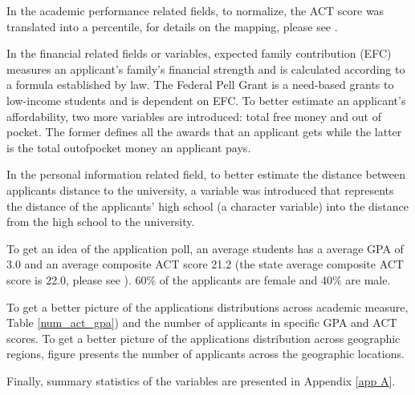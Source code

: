 \documentclass[12pt,english]{report}
\begin{document}
In the academic performance related fields, to normalize, the ACT score was
translated into a percentile, for details on the mapping, please see
\citet{ACT_percentile}.
 
In the financial related fields or variables, expected family contribution
(EFC) measures an applicant's family's financial strength and is calculated
according to a formula established by law. The Federal Pell Grant is a
need-based grants to low-income students and is dependent on EFC. To better
estimate an applicant's affordability, two more variables are introduced: total
free money and out of pocket. The former defines all the awards that an
applicant gets while the latter is the total out\-of\-pocket money an applicant
pays.

In the personal information related field, to better estimate the distance
between applicants distance to the university, a variable was introduced that
represents the distance of the applicants' high school (a character variable)
into the distance from the high school to the university.

To get an idea of the application poll, an average students has a average GPA
of 3.0 and an average composite ACT score 21.2 (the state average composite ACT
score is 22.0, please see \citet{mean_sat}). 60\% of the applicants are female
and 40\% are male.  %
    
To get a better picture of the applications distributions across academic
measure, Table \ref{num_act_gpa}) and the number of applicants in specific GPA
and ACT scores. To get a better picture of the applications distribution across
geographic regions, figure presents the number of applicants across the
geographic locations.

Finally, summary statistics of the variables are presented in Appendix \ref{app
A}.
\end{document}

